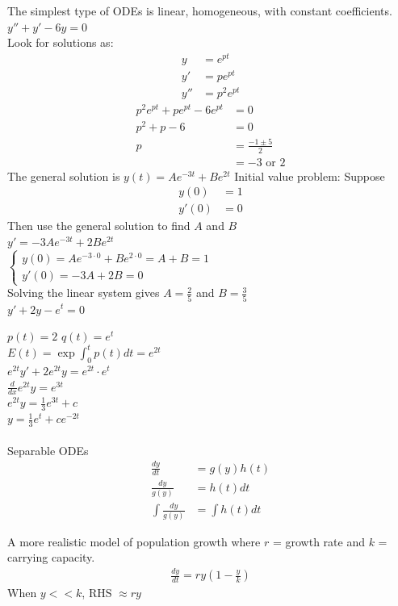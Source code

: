 \documentclass[12pt, letterpaper]{article}
\begin{document}
\noindent The simplest type of ODEs is linear, homogeneous, with constant coefficients.\\
\quad $y''+y' -6y = 0$  \\
Look for solutions as:
\begin{align*}
    y &= e^{pt}\\
    y' &= pe^{pt}\\
    y'' &= p^2e^{pt}
\end{align*}
\begin{align*}
    p^2e^{pt} + pe^{pt} - 6e^{pt} &=0 \\
    p^2 + p -6 &= 0 \\
    p &= \frac{-1 \pm 5}{2} \\
    &= -3 \text{ or } 2
\end{align*}
The general solution is $y(t) = Ae^{-3t} + Be^{2t}$
Initial value problem:
Suppose
\begin{align*}
    y(0) &= 1 \\
    y'(0) &= 0 
\end{align*}
Then use the general solution to find $A$ and $B$ \\
$y' = -3Ae^{-3t} + 2Be^{2t}$ \\
$\begin{cases}
    y(0) = Ae^{-3\cdot 0} + Be^{2\cdot 0} = A+B = 1 \\ 
    y'(0) = -3A+ 2B = 0
\end{cases}$ \\ 
Solving the linear system gives $A = \frac{2}{5}$ and $B = \frac{3}{5}$ \\ 

\noindent {}\quad $y'+2y-e^t = 0 $ 

$p(t) = 2$ \quad $q(t) = e^t$ \\
$E(t) = \exp \int_{0}^{t}p(t)dt = e^{2t}$ \\ 
$e^{2t}y'+2e^{2t}y =  e^{2t}\cdot e^{t}$ \\
$\frac{d}{dx} e^{2t}y = e^{3t}$ \\
$e^{2t}y = \frac 13 e^{3t} + c$ \\
$y = \frac{1}{3} e^t +ce^{-2t}$ \\ \\ 

\noindent Separable ODEs
\begin{align*}
    \frac{dy}{dt} &= g(y)h(t) \\
    \frac{dy}{g(y)} &= h(t)dt \\
    \int \frac{dy}{g(y)} &= \int h(t)dt 
\end{align*}

\noindent A more realistic model of population growth where $r$ = growth rate and $k$ = carrying capacity.
\begin{align*}
    \frac{dy}{dt} = ry(1-\frac yk)
\end{align*}
When $y<<k$, RHS $\approx ry$
\end{document}
